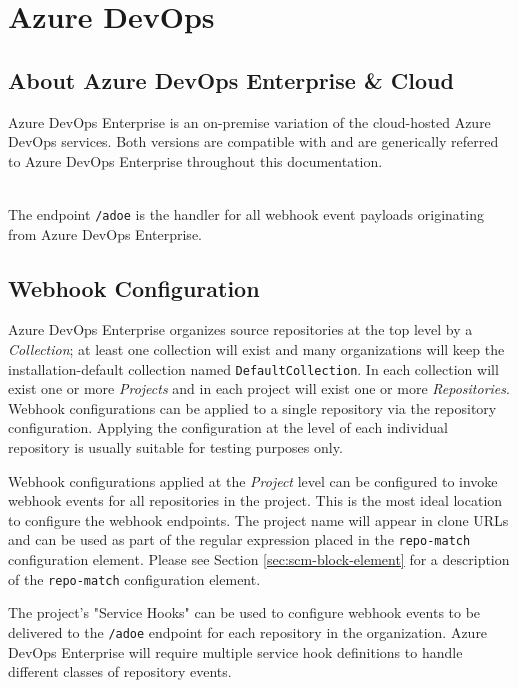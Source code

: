 \chapter{Azure DevOps}


\section{About Azure DevOps Enterprise \& Cloud}

Azure DevOps Enterprise is an on-premise variation of the cloud-hosted Azure DevOps services.
Both versions are compatible with \cxoneflow and are generically referred to Azure DevOps Enterprise
throughout this documentation.

\noindent\\The \cxoneflow endpoint \texttt{/adoe} is the handler for all webhook event
payloads originating from Azure DevOps Enterprise.  

\section{Webhook Configuration}

Azure DevOps Enterprise organizes source repositories at the top level by a \textit{Collection};
at least one collection will exist and many organizations will keep the installation-default
collection named \texttt{DefaultCollection}.  In each collection will exist one or more
\textit{Projects} and in each project will exist one or more \textit{Repositories}.  
Webhook configurations can be applied to a single repository via the repository configuration.
Applying the configuration at the level of each individual repository is usually suitable
for testing purposes only.

Webhook configurations applied at the \textit{Project} level can be configured to invoke webhook
events for all repositories in the project.  This is the most ideal location to configure
the webhook endpoints.  The project name will appear in clone URLs and can be used as part of 
the regular expression placed in the \texttt{repo-match} configuration element.  Please see 
Section \ref{sec:scm-block-element} for a description of the \texttt{repo-match} configuration
element.

The project's "Service Hooks" can be used to configure webhook events to be delivered to the
\cxoneflow \texttt{/adoe} endpoint for each repository in the organization.  Azure DevOps
Enterprise will require multiple service hook definitions to handle different classes
of repository events.

